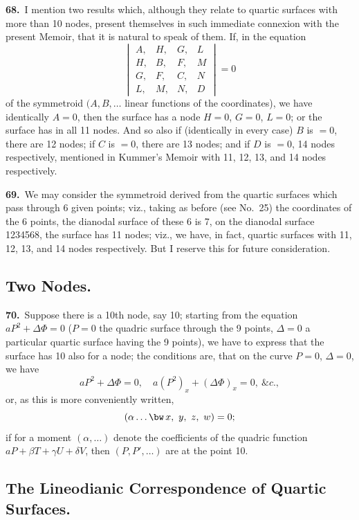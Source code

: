 \documentclass[11pt,a4paper]{article}
\begin{document}
\noindent\textbf{68.}\ I mention two results which, although they relate to quartic surfaces with more than 10 nodes, present themselves in such immediate connexion with the present Memoir, that it is natural to speak of them. If, in the equation
\[
\begin{vmatrix}
A, & H, & G, & L\\
H, & B, & F, & M\\
G, & F, & C, & N\\
L, & M, & N, & D
\end{vmatrix} = 0
\]
of the symmetroid $(A, B, \ldots$ linear functions of the coordinates), we have identically $A = 0$, then the surface has a node $H = 0$, $G = 0$, $L = 0$; or the surface has in all 11 nodes. And so also if (identically in every case) $B$ is $= 0$, there are 12 nodes; if $C$ is $= 0$, there are 13 nodes; and if $D$ is $= 0$, 14 nodes respectively, mentioned in Kummer's Memoir with 11, 12, 13, and 14 nodes respectively.

\medskip

\textbf{69.}\ We may consider the symmetroid derived from the quartic surfaces which pass through 6 given points; viz., taking as before (see No.\ 25) the coordinates of the 6 points, the dianodal surface of these 6 is 7, on the dianodal surface 1234568, the surface has 11 nodes; viz., we have, in fact, quartic surfaces with 11, 12, 13, and 14 nodes respectively. But I reserve this for future consideration.

\subsection*{Two Nodes.}

\noindent\textbf{70.}\ Suppose there is a 10th node, say 10; starting from the equation $aP^2 + \Delta\Phi = 0$ ($P = 0$ the quadric surface through the 9 points, $\Delta = 0$ a particular quartic surface having the 9 points), we have to express that the surface has 10 also for a node; the conditions are, that on the curve $P = 0$, $\Delta = 0$, we have
\[
aP^2 + \Delta\Phi = 0,\quad a(P^2)_x + (\Delta\Phi)_x = 0,\ \&c.,
\]
or, as this is more conveniently written,
\[
(\alpha\ldots \bw\, x,\ y,\ z,\ w) = 0;
\]
if for a moment $(\alpha,\ldots)$ denote the coefficients of the quadric function $aP + \beta T + \gamma U + \delta V$, then $(P, P', \ldots)$ are at the point 10.

\newpage
\setcounter{page}{159}

\subsection*{The Lineodianic Correspondence of Quartic Surfaces.}
\end{document}
